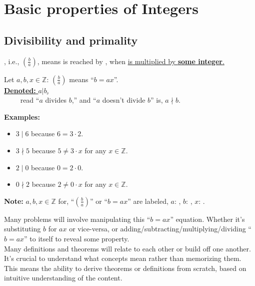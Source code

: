 \chapter{Basic properties of Integers}

\section{Divisibility and primality}

, i.e., $\left(\frac{b}{a}\right)$, means  is reached by , when \underline{ is multiplied by \textbf{some integer}.}

\begin{Def}[Division]

    Let $a,b,x\in\mathbb{Z}$: $\left(\frac{b}{a}\right)$ means ``$b=ax$''.\\

    \noindent
    \underline{\textbf{Denoted:} $a|b$,}\\
    $\qquad$ read ``$a$ divides $b$,'' and ``$a$ doesn't divide $b$'' is, $a\nmid b$.\\
    \noindent
\end{Def}

\noindent
\textbf{Examples:}
\begin{itemize}
    \item $3\mid 6$ because $6=3\cdot2$.
    \item $3\nmid5$ because $5\neq3\cdot x$ for any $x\in\mathbb{Z}$.
    \item $2\mid 0$ because $0=2\cdot0$.
    \item $0\nmid2$ because $2\neq0\cdot x$ for any $x\in\mathbb{Z}$.
\end{itemize}


\begin{Note}
    \textbf{Note:} $a,b,x\in\mathbb{Z}$ for, ``$\left(\frac{b}{a}\right)$'' or ``$b = ax$'' are labeled, $a$: , $b$: , $x$: .
\end{Note}

\begin{Tip}
    Many problems will involve manipulating this ``$b=ax$'' equation. Whether
    it's substituting $b$ for $ax$ or vice-versa, or adding/subtracting/multiplying/dividing ``$b=ax$''
    to itself to reveal some property.\\

    \noindent
    Many definitions and theorems will relate to each other or build off one another.
    It's crucial to understand what concepts mean rather than memorizing them. This means
    the ability to derive theorems or definitions from scratch, based on intuitive
    understanding of the content.
\end{Tip}

